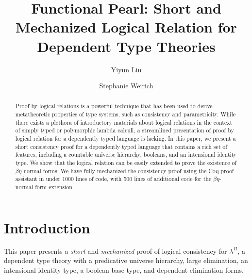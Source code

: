 \documentclass[\ifpublic nolinenum\else\fi,online,OA]{jfp}
\newcommand{\lang}{$\lambda^{\Pi}$\xspace}
\theoremstyle{definition}
\begin{document}
\totalpg{\pageref{lastpage}}

\title{Functional Pearl: Short and Mechanized Logical Relation for Dependent Type Theories}

\begin{authgrp}
\author{Yiyun Liu}


\author{Stephanie Weirich}
\end{authgrp}

\begin{abstract}
Proof by logical relations is a powerful technique that has been used
to derive metatheoretic properties of type systems, such as
consistency and parametricity. While there exists a
plethora of introductory materials about logical relations in the
context of simply typed or polymorphic lambda calculi, a streamlined
presentation of proof by logical relation for a dependently typed language
is lacking. In this paper, we present a short
consistency proof for a dependently typed language that contains a
rich set of features, including a countable universe
hierarchy, booleans, and an intensional identity type. We show that
the logical relation can be easily extended to prove the existence of
$\beta\eta$-normal forms.
We have
fully mechanized the consistency proof using the Coq proof assistant
in under 1000 lines of code, with 500 lines of additional code for the
$\beta\eta$-normal form extension.
\end{abstract}

\maketitle[T]

\section{Introduction}
This paper presents a \emph{short} and \emph{mechanized} proof of
logical consistency for \lang{}, a dependent type theory with a
predicative universe hierarchy, large elimination, an intensional identity
type, a boolean base type, and dependent elimination forms.
\end{document}
